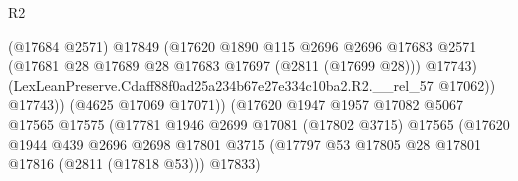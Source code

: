 \begin{lexlean}{R2}
\begin{coremodule}
                                              (@17684 @2571)
                                              @17849
                                              (@17620
                                                @1890
                                                @115
                                                @2696
                                                @2696
                                                @17683
                                                @2571
                                                (@17681
                                                  @28
                                                  @17689
                                                  @28
                                                  @17683
                                                  @17697
                                                  (@2811 (@17699 @28)))
                                                @17743)
                                              (LexLeanPreserve.Cdaff88f0ad25a234b67e27e334c10ba2.R2.__rel_57
                                                @17062))
                                            @17743))
                                        (@4625 @17069 @17071))
                                      (@17620
                                        @1947
                                        @1957
                                        @17082
                                        @5067
                                        @17565
                                        @17575
                                        (@17781
                                          @1946
                                          @2699
                                          @17081
                                          (@17802 @3715)
                                          @17565
                                          (@17620
                                            @1944
                                            @439
                                            @2696
                                            @2698
                                            @17801
                                            @3715
                                            (@17797
                                              @53
                                              @17805
                                              @28
                                              @17801
                                              @17816
                                              (@2811 (@17818 @53)))
                                            @17833)

\end{coremodule}
\end{lexlean}
